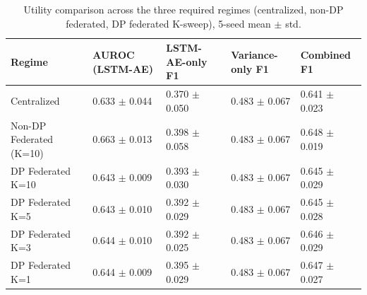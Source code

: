 \begin{table}[t]
\centering
\caption{Utility comparison across the three required regimes (centralized, non-DP federated, DP federated K-sweep), 5-seed mean $\pm$ std.}
\label{tab:m3-utility-primary}
\begin{tabular}{@{}lllll@{}}
\toprule
Regime & AUROC (LSTM-AE) & LSTM-AE-only F1 & Variance-only F1 & Combined F1 \\
\midrule
Centralized & 0.633 $\pm$ 0.044 & 0.370 $\pm$ 0.050 & 0.483 $\pm$ 0.067 & 0.641 $\pm$ 0.023 \\
Non-DP Federated (K=10) & 0.663 $\pm$ 0.013 & 0.398 $\pm$ 0.058 & 0.483 $\pm$ 0.067 & 0.648 $\pm$ 0.019 \\
DP Federated K=10 & 0.643 $\pm$ 0.009 & 0.393 $\pm$ 0.030 & 0.483 $\pm$ 0.067 & 0.645 $\pm$ 0.029 \\
DP Federated K=5 & 0.643 $\pm$ 0.010 & 0.392 $\pm$ 0.029 & 0.483 $\pm$ 0.067 & 0.645 $\pm$ 0.028 \\
DP Federated K=3 & 0.644 $\pm$ 0.010 & 0.392 $\pm$ 0.025 & 0.483 $\pm$ 0.067 & 0.646 $\pm$ 0.029 \\
DP Federated K=1 & 0.644 $\pm$ 0.009 & 0.395 $\pm$ 0.029 & 0.483 $\pm$ 0.067 & 0.647 $\pm$ 0.027 \\
\bottomrule
\end{tabular}
\end{table}
